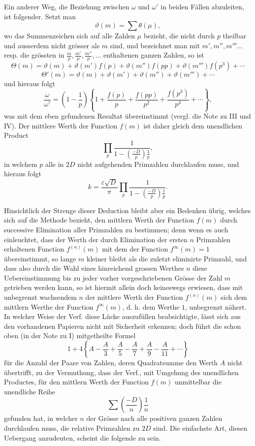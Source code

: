 \documentclass[12pt]{article}
\begin{document}
Ein anderer Weg, die Beziehung zwischen \(\omega\) und \(\omega'\) in beiden Fällen abzuleiten, ist folgender. Setzt man
\[
\vartheta(m)=\sum\theta(\mu),
\]
wo das Summenzeichen sich auf alle Zahlen \(\mu\) bezieht, die nicht durch \(p\) theilbar und ausserdem nicht grösser als \(m\) sind, und bezeichnet man mit \(m',m'',m'''\ldots\) resp. die grössten in \(\frac{m}{p},\frac{m'}p,\frac{m''}p,\ldots\) enthaltenen ganzen Zahlen, so ist
\[
\Theta(m)=\vartheta(m)+\vartheta(m')f(p)+\vartheta(m'')f(pp)+\vartheta(m''')f(p^3)+\cdots
\]
\[
\Theta'(m)=\vartheta(m)+\vartheta(m')+\vartheta(m'')+\vartheta(m''')+\cdots
\]
und hieraus folgt
\[
\frac{\omega}{\omega'}=\left(1-\frac1p\right)\left\{1+\frac{f(p)}p+\frac{f(pp)}{p^2}+\frac{f(p^3)}{p^3}+\cdots\right\},
\]
was mit dem eben gefundenen Resultat übereinstimmt (vergl. die Note zu III und IV). Der mittlere Werth der Function \(f(m)\) ist daher gleich dem unendlichen Product
\[
\prod_p\frac{1}{1-\left(\frac{-D}{p}\right)\frac1p},
\]
in welchem \(p\) alle in \(2D\) nicht aufgehenden Primzahlen durchlaufen muss, und hieraus folgt
\[
k=\frac{\varepsilon\sqrt D}{\pi}\prod_p\frac{1}{1-\left(\frac{-D}{p}\right)\frac1p}.
\]

Hinsichtlich der Strenge dieser Deduction bleibt aber ein Bedenken übrig, welches sich auf die Methode bezieht, den mittlern Werth der Function \(f(m)\) durch successive Elimination aller Primzahlen zu bestimmen; denn wenn es auch einleuchtet, dass der Werth der durch Elimination der ersten \(n\) Primzahlen erhaltenen Function \(f^{(n)}(m)\) mit dem der Function \(f^\infty(m)=1\) übereinstimmt, so lange \(m\) kleiner bleibt als die zuletzt eliminirte Primzahl, und dass also durch die Wahl eines hinreichend grossen Werthes \(n\) diese Uebereinstimmung bis zu jeder vorher vorgeschriebenen Grösse der Zahl \(m\) getrieben werden kann, so ist hiermit allein doch keineswegs erwiesen, dass mit unbegrenzt wachsendem \(n\) der mittlere Werth der Function \(f^{(n)}(m)\) sich dem mittlern Werthe der Function \(f^\infty(m)\), d. h. dem Werthe \(1\), unbegrenzt nähert. In welcher Weise der Verf. diese Lücke auszufüllen beabsichtigte, lässt sich aus den vorhandenen Papieren nicht mit Sicherheit erkennen; doch führt die schon oben (in der Note zu I) mitgetheilte Formel
\[
1+4\left\{A-\frac A3+\frac A5-\frac A7+\frac A9-\frac A{11}+\cdots\right\}
\]
für die Anzahl der Paare von Zahlen, deren Quadratsumme den Werth \(A\) nicht übertrifft, zu der Vermuthung, dass der Verf., mit Umgehung des unendlichen Productes, für den mittlern Werth der Function \(f(m)\) unmittelbar die unendliche Reihe
\[
\sum\left(\frac{-D}{n}\right)\frac1n
\]
gefunden hat, in welcher \(n\) der Grösse nach alle positiven ganzen Zahlen durchlaufen muss, die relative Primzahlen zu \(2D\) sind. Die einfachste Art, diesen Uebergang anzudeuten, scheint die folgende zu sein.
\end{document}

